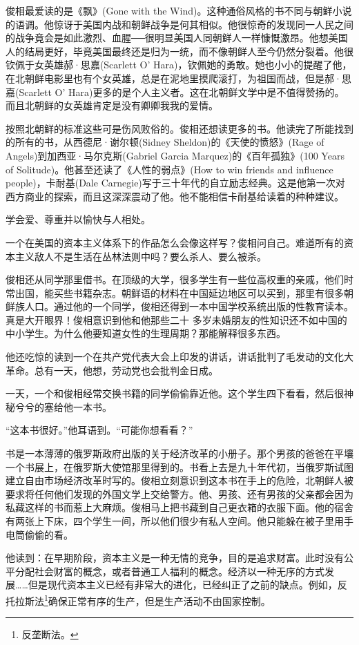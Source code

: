 俊相最爱读的是《飘》(Gone with the Wind)。这种通俗风格的书不同与朝鲜小说的语调。他惊讶于美国内战和朝鲜战争是何其相似。他很惊奇的发现同一人民之间的战争竟会是如此激烈、血腥──很明显美国人同朝鲜人一样慷慨激昂。他想美国人的结局更好，毕竟美国最终还是归为一统，而不像朝鲜人至今仍然分裂着。他很钦佩于女英雄郝·思嘉(Scarlett O{\EN '} Hara)，钦佩她的勇敢。她也小小的提醒了他，在北朝鲜电影里也有个女英雄，总是在泥地里摸爬滚打，为祖国而战，但是郝·思嘉(Scarlett O{\EN '} Hara)更多的是个人主义者。这在北朝鲜文学中是不值得赞扬的。而且北朝鲜的女英雄肯定是没有卿卿我我的爱情。

按照北朝鲜的标准这些可是伤风败俗的。俊相还想读更多的书。他读完了所能找到的所有的书，从西德尼·谢尔顿(Sidney Sheldon)的《天使的愤怒》(Rage of Angels)到加西亚·马尔克斯(Gabriel Garcia Marquez)的《百年孤独》(100 Years of Solitude)。他甚至还读了《人性的弱点》(How to win friends and influence people)，卡耐基(Dale Carnegie)写于三十年代的自立励志经典。这是他第一次对西方商业的探索，而且这深深震动了他。他不能相信卡耐基给读着的种种建议。

学会爱、尊重并以愉快与人相处。

一个在美国的资本主义体系下的作品怎么会像这样写？俊相问自己。难道所有的资本主义敌人不是生活在丛林法则中吗？要么杀人、要么被杀。

俊相还从同学那里借书。在顶级的大学，很多学生有一些位高权重的亲戚，他们时常出国，能买些书籍杂志。朝鲜语的材料在中国延边地区可以买到，那里有很多朝鲜族人口。通过他的一个同学，俊相还得到一本中国学校系统出版的性教育读本。真是大开眼界！俊相意识到他和他那些二十 多岁未婚朋友的性知识还不如中国的中小学生。为什么他要知道女性的生理周期？那能解释很多东西。

他还吃惊的读到一个在共产党代表大会上印发的讲话，讲话批判了毛发动的文化大革命。总有一天，他想，劳动党也会批判金日成。

一天，一个和俊相经常交换书籍的同学偷偷靠近他。这个学生四下看看，然后很神秘兮兮的塞给他一本书。

“这本书很好。”他耳语到。“可能你想看看？”

书是一本薄薄的俄罗斯政府出版的关于经济改革的小册子。那个男孩的爸爸在平壤一个书展上，在俄罗斯大使馆那里得到的。书看上去是九十年代初，当俄罗斯试图建立自由市场经济改革时写的。俊相立刻意识到这本书在手上的危险，北朝鲜人被要求将任何他们发现的外国文学上交给警方。他、男孩、还有男孩的父亲都会因为私藏这样的书而惹上大麻烦。俊相马上把书藏到自己更衣箱的衣服下面。他的宿舍有两张上下床，四个学生一间，所以他们很少有私人空间。他只能躲在被子里用手电筒偷偷的看。

他读到：在早期阶段，资本主义是一种无情的竞争，目的是追求财富。此时没有公平分配社会财富的概念，或者普通工人福利的概念。经济以一种无序的方式发展……但是现代资本主义已经有非常大的进化，已经纠正了之前的缺点。例如，反托拉斯法\footnote{反垄断法。}确保正常有序的生产，但是生产活动不由国家控制。

